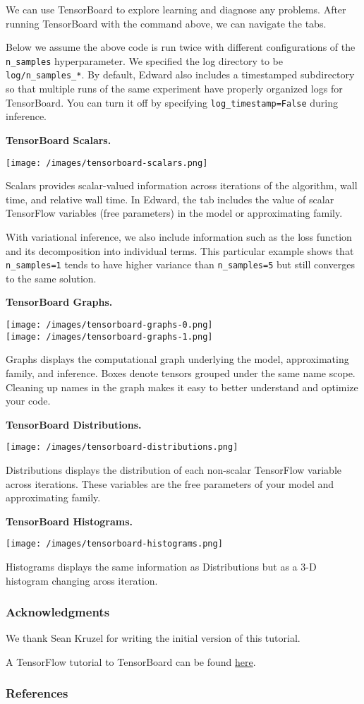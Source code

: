 We can use TensorBoard to explore learning and diagnose any problems.
After running TensorBoard with the command above, we can navigate the
tabs.

Below we assume the above code is run twice with different
configurations
of the \texttt{n_samples} hyperparameter.
We specified the log directory to be \texttt{log/n_samples_*}.
By default, Edward also includes a timestamped subdirectory so that
multiple runs of the same experiment have properly organized logs for
TensorBoard. You can turn it off by specifying
\texttt{log_timestamp=False} during inference.

\textbf{TensorBoard Scalars.}

\texttt{[image: /images/tensorboard-scalars.png]}

Scalars provides scalar-valued information across iterations of the
algorithm, wall time, and relative wall time. In Edward, the tab
includes the value of scalar TensorFlow variables (free parameters) in
the model or approximating family.

With variational inference, we also include information such as the
loss function and its decomposition into individual terms. This
particular example shows that \texttt{n_samples=1} tends to have higher
variance than \texttt{n_samples=5} but still converges to the same solution.

\textbf{TensorBoard Graphs.}

\texttt{[image: /images/tensorboard-graphs-0.png]} \\
\texttt{[image: /images/tensorboard-graphs-1.png]}

Graphs displays the computational graph underlying the model,
approximating family, and inference. Boxes denote tensors grouped
under the same name scope. Cleaning up names in the graph makes it
easy to better understand and optimize your code.

\textbf{TensorBoard Distributions.}

\texttt{[image: /images/tensorboard-distributions.png]}

Distributions displays the distribution of each non-scalar TensorFlow
variable across iterations. These variables are the free parameters
of your model and approximating family.

\textbf{TensorBoard Histograms.}

\texttt{[image: /images/tensorboard-histograms.png]}

Histograms displays the same information as Distributions but as a 3-D
histogram changing aross iteration.

\subsubsection{Acknowledgments}

We thank Sean Kruzel for writing the initial version of this
tutorial.

A TensorFlow tutorial to TensorBoard can be found
\href{https://www.tensorflow.org/get_started/summaries_and_tensorboard}
{here}.

\subsubsection{References}\label{references}

